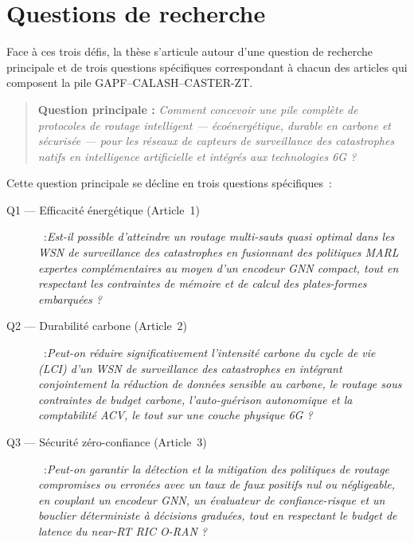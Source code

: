 \section{Questions de recherche}\label{sec:Questions}

Face à ces trois défis, la thèse s'articule autour d'une question de recherche principale et de trois questions spécifiques correspondant à chacun des articles qui composent la pile GAPF--CALASH--CASTER-ZT.

\medskip
\begin{quote}
\textbf{Question principale :} \emph{Comment concevoir une pile complète de protocoles de routage intelligent — écoénergétique, durable en carbone et sécurisée — pour les réseaux de capteurs de surveillance des catastrophes natifs en intelligence artificielle et intégrés aux technologies 6G ?}
\end{quote}

\medskip
Cette question principale se décline en trois questions spécifiques~:

\begin{description}
  \item[Q1 — Efficacité énergétique (Article~1)]~:\emph{Est-il possible d'atteindre un routage multi-sauts quasi optimal dans les WSN de surveillance des catastrophes en fusionnant des politiques MARL expertes complémentaires au moyen d'un encodeur GNN compact, tout en respectant les contraintes de mémoire et de calcul des plates-formes embarquées ?}\cite{gapf_tgcn2026,rashid2018qmix,son2019qtran,liu2024gnncomm,tinyml_review_acm2024}

  \item[Q2 — Durabilité carbone (Article~2)]~:\emph{Peut-on réduire significativement l'intensité carbone du cycle de vie (LCI) d'un WSN de surveillance des catastrophes en intégrant conjointement la réduction de données sensible au carbone, le routage sous contraintes de budget carbone, l'auto-guérison autonomique et la comptabilité ACV, le tout sur une couche physique 6G ?}\cite{pirson2021embodied,freitag2021ict,aioti2024carbon,itu_ict2025}

  \item[Q3 — Sécurité zéro-confiance (Article~3)]~:\emph{Peut-on garantir la détection et la mitigation des politiques de routage compromises ou erronées avec un taux de faux positifs nul ou négligeable, en couplant un encodeur GNN, un évaluateur de confiance-risque et un bouclier déterministe à décisions graduées, tout en respectant le budget de latence du near-RT RIC O-RAN ?}\cite{rose2020nist,polese2023oran,pranger2025shields,ztaiot_acm2025}
\end{description}

